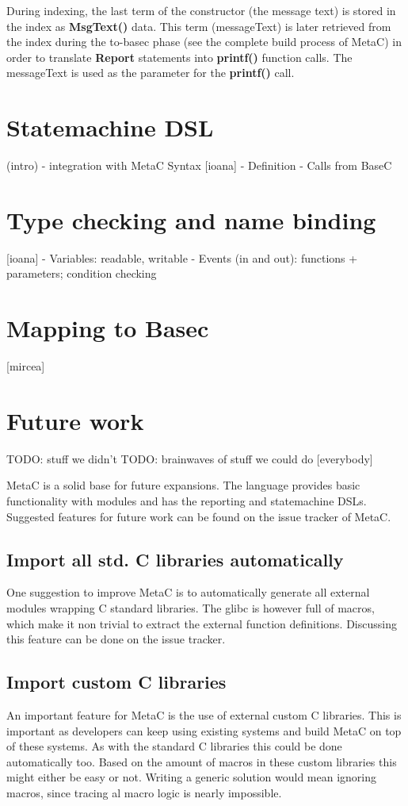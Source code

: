 \documentclass[a4paper,10pt,titlepage]{report}
\begin{document}
During indexing, the last term of the constructor (the message text) is stored in the index as \textbf{MsgText()} data. This term (messageText) is later retrieved from the index during the to-basec phase (see the complete build process of MetaC) in order to translate \textbf{Report} statements into \textbf{printf()} function calls. The messageText is used as the parameter for the \textbf{printf()} call.

\chapter{Statemachine DSL}
(intro)
- integration with MetaC
Syntax
[ioana]
-          Definition
-          Calls from BaseC


\chapter{Type checking and name binding}
[ioana]
-          Variables: readable, writable
-          Events (in and out): functions + parameters; condition checking 

\chapter{Mapping to Basec}
[mircea]

\chapter{Future work}
TODO: stuff we didn’t
TODO: brainwaves of stuff we could do
[everybody]

MetaC is a solid base for future expansions. The language provides basic functionality with modules and has the reporting and statemachine DSLs. Suggested features for future work can be found on the issue tracker of MetaC.
\section{Import all std. C libraries automatically}
One suggestion to improve MetaC is to automatically generate all external modules wrapping C standard libraries. The glibc is however full of macros, which make it non trivial to extract the external function definitions. Discussing this feature can be done on the issue tracker.
\section{Import custom C libraries}
An important feature for MetaC is the use of external custom C libraries. This is important as developers can keep using existing systems and build MetaC on top of these systems. As with the standard C libraries this could be done automatically too. Based on the amount of macros in these custom libraries this might either be easy or not. Writing a generic solution would mean ignoring macros, since tracing al macro logic is nearly impossible.
\end{document}
